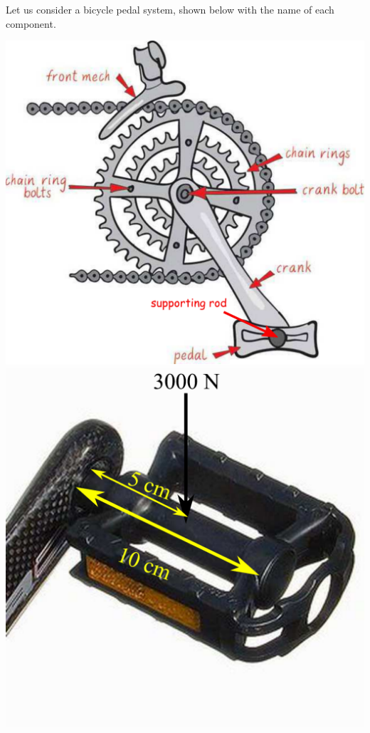 \documentclass[
10pt,
a4paper,
openany,
svgnames,
]{book}
\newcommand{\exercise}{%
\item \label{lab:\arabic{chapter}.\arabic{exercisesi}}  %
}
\begin{document}
\begin{exercises}
  \exercise Let us consider a bicycle pedal system, shown below with the name of each component.
  \begin{center}
    \includegraphics[scale=0.44]{pictures/Machine-interaction/pedal-system}
    \includegraphics[scale=0.3]{pictures/Machine-interaction/pedal}
  \end{center}
  

\end{exercises}
\end{document}
